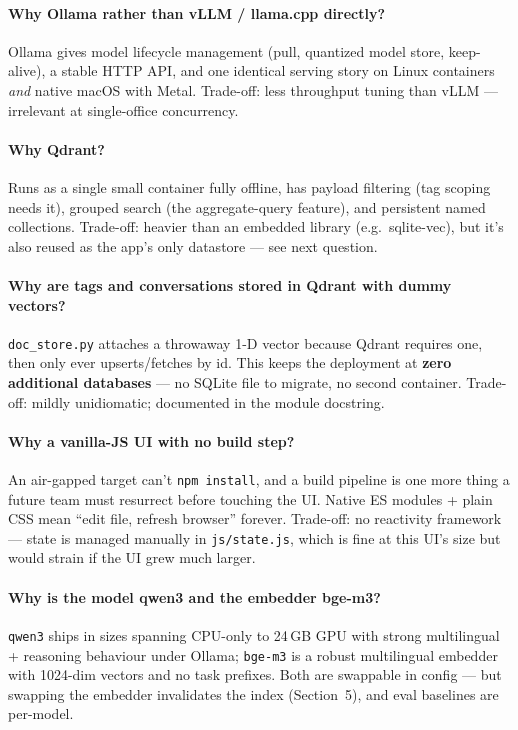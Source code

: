 \documentclass[11pt,letterpaper]{article}
\begin{document}
\paragraph{Why Ollama rather than vLLM / llama.cpp directly?}
Ollama gives model lifecycle management (pull, quantized model store,
keep-alive), a stable HTTP API, and one identical serving story on Linux
containers \emph{and} native macOS with Metal. Trade-off: less throughput
tuning than vLLM --- irrelevant at single-office concurrency.

\paragraph{Why Qdrant?}
Runs as a single small container fully offline, has payload filtering (tag
scoping needs it), grouped search (the aggregate-query feature), and
persistent named collections. Trade-off: heavier than an embedded library
(e.g.\ sqlite-vec), but it's also reused as the app's only datastore ---
see next question.

\paragraph{Why are tags and conversations stored in Qdrant with dummy vectors?}
\texttt{doc\_store.py} attaches a throwaway 1-D vector because Qdrant
requires one, then only ever upserts/fetches by id. This keeps the
deployment at \textbf{zero additional databases} --- no SQLite file to
migrate, no second container. Trade-off: mildly unidiomatic; documented in
the module docstring.

\paragraph{Why a vanilla-JS UI with no build step?}
An air-gapped target can't \texttt{npm install}, and a build pipeline is
one more thing a future team must resurrect before touching the UI. Native
ES modules + plain CSS mean ``edit file, refresh browser'' forever.
Trade-off: no reactivity framework --- state is managed manually in
\texttt{js/state.js}, which is fine at this UI's size but would strain if
the UI grew much larger.

\paragraph{Why is the model qwen3 and the embedder bge-m3?}
\texttt{qwen3} ships in sizes spanning CPU-only to 24\,GB GPU with strong
multilingual + reasoning behaviour under Ollama; \texttt{bge-m3} is a
robust multilingual embedder with 1024-dim vectors and no task prefixes.
Both are swappable in config --- but swapping the embedder invalidates the
index (Section~5), and eval baselines are per-model.
\end{document}
